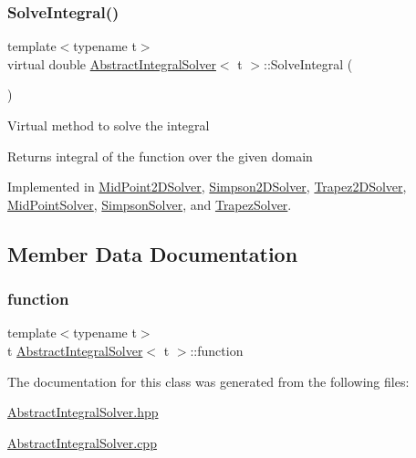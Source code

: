 \subsubsection{\texorpdfstring{Solve\+Integral()}{SolveIntegral()}}
{\footnotesize\ttfamily template$<$typename t$>$ \\
virtual double \hyperlink{class_abstract_integral_solver}{Abstract\+Integral\+Solver}$<$ t $>$\+::Solve\+Integral (\begin{DoxyParamCaption}{ }\end{DoxyParamCaption})\hspace{0.3cm}{\ttfamily [pure virtual]}}

Virtual method to solve the integral \begin{DoxyReturn}{Returns}
integral of the function over the given domain 
\end{DoxyReturn}


Implemented in \hyperlink{class_mid_point2_d_solver_a45c6c6802b7d40c35f1f60f1a39f5042}{Mid\+Point2\+D\+Solver}, \hyperlink{class_simpson2_d_solver_a3fc19037fef83ad05381138d9f7da939}{Simpson2\+D\+Solver}, \hyperlink{class_trapez2_d_solver_a88f724ff6fd2c566d54f5d0ccc500cb9}{Trapez2\+D\+Solver}, \hyperlink{class_mid_point_solver_a3e7224a0fb07b3ef7f5f9e7e577216cf}{Mid\+Point\+Solver}, \hyperlink{class_simpson_solver_a4843e8bfc0344d9a9cae8688d1114667}{Simpson\+Solver}, and \hyperlink{class_trapez_solver_a15651e2fba081b87b484a83fc424c81d}{Trapez\+Solver}.



\subsection{Member Data Documentation}
\mbox{\label{class_abstract_integral_solver_ae31c391a21c6057e313295ad04de8a69}} 
\subsubsection{\texorpdfstring{function}{function}}
{\footnotesize\ttfamily template$<$typename t$>$ \\
t \hyperlink{class_abstract_integral_solver}{Abstract\+Integral\+Solver}$<$ t $>$\+::function}



The documentation for this class was generated from the following files\+:\begin{DoxyCompactItemize}
\item 
\hyperlink{_abstract_integral_solver_8hpp}{Abstract\+Integral\+Solver.\+hpp}\item 
\hyperlink{_abstract_integral_solver_8cpp}{Abstract\+Integral\+Solver.\+cpp}\end{DoxyCompactItemize}
